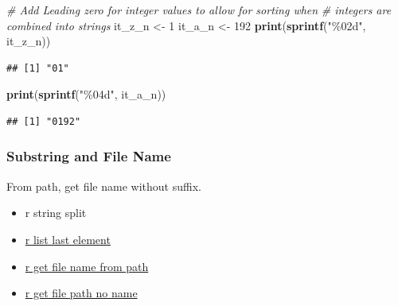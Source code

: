 \documentclass[
]{book}
\newenvironment{Shaded}{\begin{snugshade}}{\end{snugshade}}
\newcommand{\CommentTok}[1]{\textcolor[rgb]{0.56,0.35,0.01}{\textit{#1}}}
\newcommand{\DecValTok}[1]{\textcolor[rgb]{0.00,0.00,0.81}{#1}}
\newcommand{\KeywordTok}[1]{\textcolor[rgb]{0.13,0.29,0.53}{\textbf{#1}}}
\newcommand{\NormalTok}[1]{#1}
\newcommand{\StringTok}[1]{\textcolor[rgb]{0.31,0.60,0.02}{#1}}
\providecommand{\tightlist}{%
  \setlength{\itemsep}{0pt}\setlength{\parskip}{0pt}}
\begin{document}
\begin{Shaded}
\begin{Highlighting}[]
\CommentTok{\# Add Leading zero for integer values to allow for sorting when}
\CommentTok{\# integers are combined into strings}
\NormalTok{it\_z\_n \textless{}{-}}\StringTok{ }\DecValTok{1}
\NormalTok{it\_a\_n \textless{}{-}}\StringTok{ }\DecValTok{192}
\KeywordTok{print}\NormalTok{(}\KeywordTok{sprintf}\NormalTok{(}\StringTok{"\%02d"}\NormalTok{, it\_z\_n))}
\end{Highlighting}
\end{Shaded}

\begin{verbatim}
## [1] "01"
\end{verbatim}

\begin{Shaded}
\begin{Highlighting}[]
\KeywordTok{print}\NormalTok{(}\KeywordTok{sprintf}\NormalTok{(}\StringTok{"\%04d"}\NormalTok{, it\_a\_n))}
\end{Highlighting}
\end{Shaded}

\begin{verbatim}
## [1] "0192"
\end{verbatim}

\hypertarget{substring-and-file-name}{%
\subsubsection{Substring and File Name}\label{substring-and-file-name}}

From path, get file name without suffix.

\begin{itemize}
\tightlist
\item
  r string split
\item
  \href{https://stackoverflow.com/a/83222/8280804}{r list last element}
\item
  \href{https://stackoverflow.com/a/29114007/8280804}{r get file name from path}
\item
  \href{https://stackoverflow.com/a/47189541/8280804}{r get file path no name}
\end{itemize}
\end{document}
